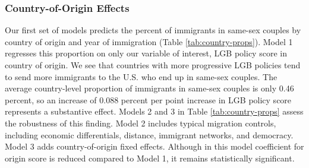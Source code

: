 \documentclass[
  11pt,
]{article}
\begin{document}
\hypertarget{country-of-origin-effects}{%
\subsubsection{Country-of-Origin Effects}\label{country-of-origin-effects}}

Our first set of models predicts the percent of immigrants in same-sex couples by country of origin and year of immigration (Table \ref{tab:country-props}). Model 1 regresses this proportion on only our variable of interest, LGB policy score in country of origin. We see that countries with more progressive LGB policies tend to send more immigrants to the U.S. who end up in same-sex couples. The average country-level proportion of immigrants in same-sex couples is only 0.46 percent, so an increase of 0.088 percent per point increase in LGB policy score represents a substantive effect. Models 2 and 3 in Table \ref{tab:country-props} assess the robustness of this finding. Model 2 includes typical migration controls, including economic differentials, distance, immigrant networks, and democracy. Model 3 adds country-of-origin fixed effects. Although in this model coefficient for origin score is reduced compared to Model 1, it remains statistically significant.
\end{document}
